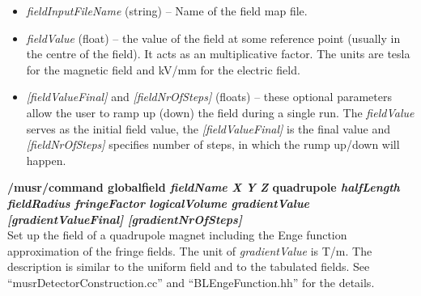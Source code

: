 \documentclass[twoside]{dis04}
\begin{document}
\begin{description}
\begin{itemize}
		{\bf 2DB, 2DE} -- magnetic or electric field specified in $R$ and $z$
			coordinate system.  The first line of the file has to contain
			the information about \emph{nR,  nz, length unit} and 
			\emph{field normalisation factor}. The compact form of the field
			map (see 3DB case) is not supported.
			The next few lines of the field map file beginning with
			the character ``\%'' are comments.
			The following lines specify the \emph{R, z, Field\_R} \emph{Field\_z}
			values.\\
		{\bf 2DBOpera} -- 2D magnetic field in the form of OPERA output.
			It is expected that the \emph{length unit} is 1\,cm, and
			the \emph{field normalisation factor} is 0.00001 (Note that this default
                        normalisation is different from 3DBOpera option).
			See example of {\bf 3DBOpera} for the usage of keyword 
			``fieldNormalisation \emph{number}''.
			The data in the field map OPERA file are ordered as
			\emph{R, dummy, z, Field\_R, Field\_z, dummy}\\
		{\bf 2DBOperaXY} -- same as 2DBOpera except that the 
			data in the field map OPERA file are ordered as
			\emph{R, z, dummy, Field\_R, Field\_z, dummy}\\
	   \item \emph{fieldInputFileName} (string) -- Name of the field map file.
	   \item \emph{fieldValue} (float) -- the value of the field at some reference point
		(usually in the centre of the field).  It acts as an multiplicative
		factor.  The units are tesla for the magnetic field and  kV/mm
		for the electric field.
	   \item \emph{[fieldValueFinal]} and \emph{[fieldNrOfSteps]} (floats) 
		-- these optional parameters allow the user to ramp up (down) the field
		during a single run.  The \emph{fieldValue} serves as the initial field value,
		the \emph{[fieldValueFinal]} is the final value and \emph{[fieldNrOfSteps]}
		specifies number of steps, in which the rump up/down will happen.
	\end{itemize}

\item{\bf /musr/command globalfield \emph{fieldName} \emph{X} \emph{Y} \emph{Z} quadrupole
	\emph{halfLength} \emph{fieldRadius} \emph{fringeFactor} \emph{logicalVolume} 
	\emph{gradientValue} \emph{[gradientValueFinal]} \emph{[gradientNrOfSteps]} }\\
	Set up the field of a quadrupole magnet including the Enge function approximation of the
	fringe fields. The unit of \emph{gradientValue} is T/m. 
        The description is similar to the uniform field and to the tabulated fields.
	See ``musrDetectorConstruction.cc'' and ``BLEngeFunction.hh'' for the details.


\end{description}
\end{document}
